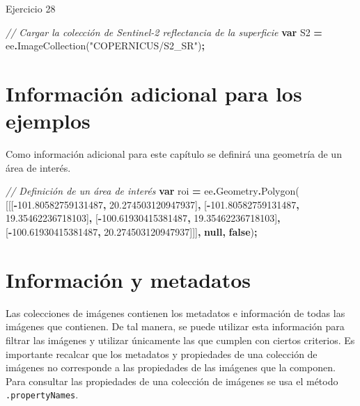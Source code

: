 \documentclass[
  12pt,
  letterpaper,
  twoside]{book}
\newenvironment{Shaded}{\begin{snugshade}}{\end{snugshade}}
\newcommand{\AttributeTok}[1]{\textcolor[rgb]{0.77,0.63,0.00}{#1}}
\newcommand{\CommentTok}[1]{\textcolor[rgb]{0.56,0.35,0.01}{\textit{#1}}}
\newcommand{\FloatTok}[1]{\textcolor[rgb]{0.00,0.00,0.81}{#1}}
\newcommand{\FunctionTok}[1]{\textcolor[rgb]{0.00,0.00,0.00}{#1}}
\newcommand{\KeywordTok}[1]{\textcolor[rgb]{0.13,0.29,0.53}{\textbf{#1}}}
\newcommand{\NormalTok}[1]{#1}
\newcommand{\OperatorTok}[1]{\textcolor[rgb]{0.81,0.36,0.00}{\textbf{#1}}}
\newcommand{\StringTok}[1]{\textcolor[rgb]{0.31,0.60,0.02}{#1}}
\begin{document}
Ejercicio 28

\begin{Shaded}
\begin{Highlighting}[]
\CommentTok{// Cargar la colección de Sentinel{-}2 reflectancia de la superficie}
\KeywordTok{var}\NormalTok{ S2 }\OperatorTok{=}\NormalTok{ ee}\OperatorTok{.}\FunctionTok{ImageCollection}\NormalTok{(}\StringTok{"COPERNICUS/S2\_SR"}\NormalTok{)}\OperatorTok{;}
\end{Highlighting}
\end{Shaded}

\hypertarget{informaciuxf3n-adicional-para-los-ejemplos-1}{%
\section{Información adicional para los ejemplos}\label{informaciuxf3n-adicional-para-los-ejemplos-1}}

Como información adicional para este capítulo se definirá una geometría de un área de interés.

\begin{Shaded}
\begin{Highlighting}[]
\CommentTok{// Definición de un área de interés}
\KeywordTok{var}\NormalTok{ roi }\OperatorTok{=}\NormalTok{ ee}\OperatorTok{.}\AttributeTok{Geometry}\OperatorTok{.}\FunctionTok{Polygon}\NormalTok{(}
\NormalTok{        [[[}\OperatorTok{{-}}\FloatTok{101.80582759131487}\OperatorTok{,} \FloatTok{20.274503120947937}\NormalTok{]}\OperatorTok{,}
\NormalTok{          [}\OperatorTok{{-}}\FloatTok{101.80582759131487}\OperatorTok{,} \FloatTok{19.35462236718103}\NormalTok{]}\OperatorTok{,}
\NormalTok{          [}\OperatorTok{{-}}\FloatTok{100.61930415381487}\OperatorTok{,} \FloatTok{19.35462236718103}\NormalTok{]}\OperatorTok{,}
\NormalTok{          [}\OperatorTok{{-}}\FloatTok{100.61930415381487}\OperatorTok{,} \FloatTok{20.274503120947937}\NormalTok{]]]}\OperatorTok{,} \KeywordTok{null}\OperatorTok{,} \KeywordTok{false}\NormalTok{)}\OperatorTok{;}
\end{Highlighting}
\end{Shaded}

\hypertarget{informaciuxf3n-y-metadatos-4}{%
\section{Información y metadatos}\label{informaciuxf3n-y-metadatos-4}}

Las colecciones de imágenes contienen los metadatos e información de todas las imágenes que contienen. De tal manera, se puede utilizar esta información para filtrar las imágenes y utilizar únicamente las que cumplen con ciertos criterios. Es importante recalcar que los metadatos y propiedades de una colección de imágenes no corresponde a las propiedades de las imágenes que la componen. Para consultar las propiedades de una colección de imágenes se usa el método \texttt{.propertyNames}.
\end{document}
